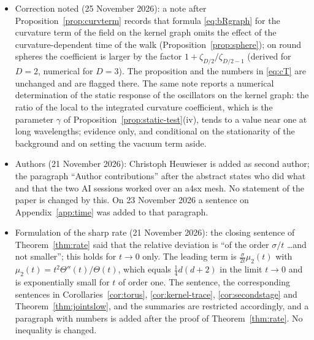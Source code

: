 \documentclass[11pt,a4paper]{article}
\theoremstyle{stmt}
\theoremstyle{defn}
\theoremstyle{rmk}
\numberwithin{equation}{section}
\begin{document}
\begin{itemize}
images, so that the flat statement holds with the same periodised Gaussian kernel on both sides. A fifty-first file gives the local density response, the derivative of the diagonal of every iterated kernel, on the flat torus as an explicit Fourier sum. A fifty-second file proves the flat two-time statement directly for the periodised Gaussian kernel, in the rate form, without cut-off and without additional terms. A fifty-third file shows that the normalising second moment of the Gaussian profile is $1$. A fifty-fourth file gives the power series of $1-\sqrt{1-s}$ and the closed form of the sum over the powers for one Fourier mode. A fifty-fifth file sums these first-order local responses over the powers and over the Fourier modes of the torus.
\item Correction noted (25 November 2026): a note after Proposition~\ref{prop:curvterm} records that formula \eqref{eq:bRgraph} for the curvature term of the field on the kernel graph omits the effect of the curvature-dependent time of the walk (Proposition~\ref{prop:sphere}); on round spheres the coefficient is larger by the factor $1+\zeta_{D/2}/\zeta_{D/2-1}$ (derived for $D=2$, numerical for $D=3$). The proposition and the numbers in \eqref{eq:cT} are unchanged and are flagged there. The same note reports a numerical determination of the static response of the oscillators on the kernel graph: the ratio of the local to the integrated curvature coefficient, which is the parameter $\gamma$ of Proposition~\ref{prop:static-test}(iv), tends to a value near one at long wavelengths; evidence only, and conditional on the stationarity of the background and on setting the vacuum term aside.
\item Authors (21 November 2026): Christoph Heuwieser is added as second author; the paragraph ``Author contributions'' after the abstract states who did what and that the two AI sessions worked over an a4sx mesh. No statement of the paper is changed by this. On 23 November 2026 a sentence on Appendix~\ref{app:time} was added to that paragraph.
\item Formulation of the sharp rate (21 November 2026): the closing sentence of Theorem~\ref{thm:rate} said that the relative deviation is ``of the order $\sigma/t$ \dots and not smaller''; this holds for $t\to0$ only. The leading term is $\frac{\sigma}{2t}\mu_2(t)$ with $\mu_2(t)=t^2\Theta''(t)/\Theta(t)$, which equals $\frac14d(d+2)$ in the limit $t\to0$ and is exponentially small for $t$ of order one. The sentence, the corresponding sentences in Corollaries~\ref{cor:torus}, \ref{cor:kernel-trace}, \ref{cor:secondstage} and Theorem~\ref{thm:jointslow}, and the summaries are restricted accordingly, and a paragraph with numbers is added after the proof of Theorem~\ref{thm:rate}. No inequality is changed.
\end{itemize}
\end{document}
